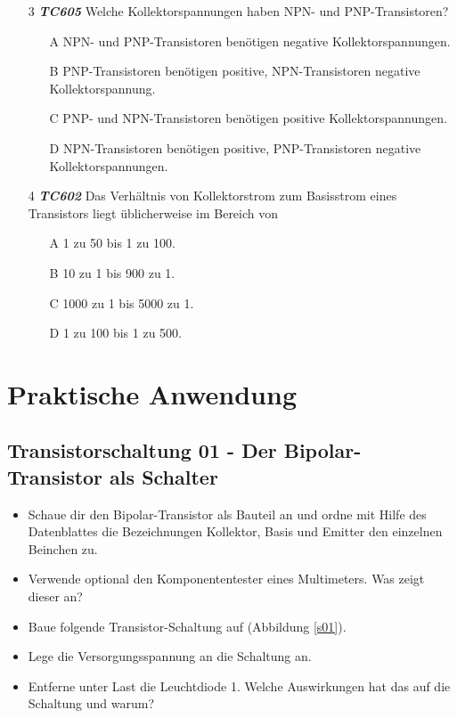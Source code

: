 \begin{enumerate} 
\itemsep1pt\parskip0pt
\item[3] \emph{\textbf{TC605}} Welche Kollektorspannungen haben NPN- und PNP-Transistoren?
	\begin{enumerate}
	\itemsep1pt\parskip0pt
		\item[A] NPN- und PNP-Transistoren benötigen negative Kollektorspannungen.
		\item[B] PNP-Transistoren benötigen positive, NPN-Transistoren negative Kollektorspannung.
		\item[C] PNP- und NPN-Transistoren benötigen positive Kollektorspannungen.
		\item[D] NPN-Transistoren benötigen positive, PNP-Transistoren negative Kollektorspannungen.
	\end{enumerate}
\end{enumerate}

\begin{enumerate} 
\item[4] \emph{\textbf{TC602}}  Das Verhältnis von Kollektorstrom zum Basisstrom eines Transistors liegt üblicherweise im Bereich von
	\begin{enumerate}
	\itemsep1pt\parskip0pt
		\item[A] 1 zu 50 bis 1 zu 100.
		\item[B] 10 zu 1 bis 900 zu 1.
		\item[C] 1000 zu 1 bis 5000 zu 1.
		\item[D] 1 zu 100 bis 1 zu 500.
	\end{enumerate}
\end{enumerate}


\section*{Praktische Anwendung}

\subsection*{Transistorschaltung 01 - Der Bipolar-Transistor als Schalter}

\begin{itemize}
\itemsep1pt\parskip0pt
\item Schaue dir den Bipolar-Transistor als Bauteil an und ordne mit Hilfe des Datenblattes die Bezeichnungen Kollektor, Basis und Emitter den einzelnen Beinchen zu.
\item Verwende optional den Komponententester eines Multimeters. Was zeigt dieser an?
\item Baue folgende Transistor-Schaltung auf (Abbildung \ref{s01}). 
\item Lege die Versorgungsspannung an die Schaltung an.
\item Entferne unter Last die Leuchtdiode 1. Welche Auswirkungen hat das auf die Schaltung und warum?
\end{itemize}

